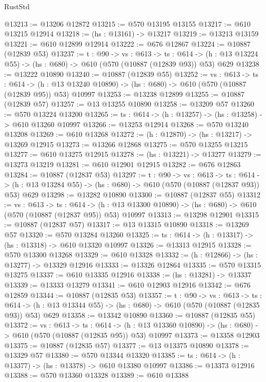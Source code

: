 \begin{lexlean}{RustStd}
\begin{coremodule}
@13213 := @13206 @12872
@13215 := @570 @13195 @13155
@13217 := @610 @13215 @12914
@13218 := (hs : @13161) -> @13217
@13219 := @13213 @13159
@13221 := @610 @12899 @12914
@13222 := @676 @12867
@13224 := @10887 (@12839 @53)
@13237 := {t : @90} ->
  {vs : @613} ->
  {ts : @614} -> (h : @13 @13224 @55) -> (hs : @680) -> @610 (@570 (@10887 (@12839 @93)) @53) @629
@13238 := @13222 @10890
@13240 := @10887 (@12839 @55)
@13252 := {vs : @613} ->
  {ts : @614} ->
  (h : @13 @13240 @10890) -> (hs : @680) -> @610 (@570 (@10887 (@12839 @95)) @53) @10997
@13253 := @13238 @12899
@13255 := @10887 (@12839 @57)
@13257 := @13 @13255 @10890
@13258 := @13209 @57
@13260 := @570 @13224 @13200
@13265 := {ts : @614} -> (h : @13257) -> (hs : @13258) -> @610 @13260 @10997
@13266 := @13253 @12914
@13268 := @570 @13240 @13208
@13269 := @610 @13268
@13272 := (h : @12870) -> (hs : @13217) -> @13269 @12915
@13273 := @13266 @12868
@13275 := @570 @13255 @13215
@13277 := @610 @13275 @12915
@13278 := (hs : @13221) -> @13277
@13279 := @13273 @13219
@13281 := @610 @12901 @12915
@13282 := @676 @12863
@13284 := @10887 (@12837 @53)
@13297 := {t : @90} ->
  {vs : @613} ->
  {ts : @614} -> (h : @13 @13284 @55) -> (hs : @680) -> @610 (@570 (@10887 (@12837 @93)) @53) @629
@13298 := @13282 @10890
@13300 := @10887 (@12837 @55)
@13312 := {vs : @613} ->
  {ts : @614} ->
  (h : @13 @13300 @10890) -> (hs : @680) -> @610 (@570 (@10887 (@12837 @95)) @53) @10997
@13313 := @13298 @12901
@13315 := @10887 (@12837 @57)
@13317 := @13 @13315 @10890
@13318 := @13269 @57
@13320 := @570 @13284 @13260
@13325 := {ts : @614} -> (h : @13317) -> (hs : @13318) -> @610 @13320 @10997
@13326 := @13313 @12915
@13328 := @570 @13300 @13268
@13329 := @610 @13328
@13332 := (h : @12866) -> (hs : @13277) -> @13329 @12916
@13333 := @13326 @12864
@13335 := @570 @13315 @13275
@13337 := @610 @13335 @12916
@13338 := (hs : @13281) -> @13337
@13339 := @13333 @13279
@13341 := @610 @12903 @12916
@13342 := @676 @12859
@13344 := @10887 (@12835 @53)
@13357 := {t : @90} ->
  {vs : @613} ->
  {ts : @614} -> (h : @13 @13344 @55) -> (hs : @680) -> @610 (@570 (@10887 (@12835 @93)) @53) @629
@13358 := @13342 @10890
@13360 := @10887 (@12835 @55)
@13372 := {vs : @613} ->
  {ts : @614} ->
  (h : @13 @13360 @10890) -> (hs : @680) -> @610 (@570 (@10887 (@12835 @95)) @53) @10997
@13373 := @13358 @12903
@13375 := @10887 (@12835 @57)
@13377 := @13 @13375 @10890
@13378 := @13329 @57
@13380 := @570 @13344 @13320
@13385 := {ts : @614} -> (h : @13377) -> (hs : @13378) -> @610 @13380 @10997
@13386 := @13373 @12916
@13388 := @570 @13360 @13328
@13389 := @610 @13388

\end{coremodule}
\end{lexlean}
